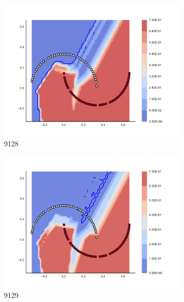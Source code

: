 \begin{figure}[h]
\begin{subfigure}[b]{0.09\textwidth}
    \includegraphics[clip, trim=2.35cm 1.75cm 4.5cm 0cm,width=\textwidth]{img/convergence/9128.pdf}
    \caption{9128}
    \label{fig:convergence_9128}
\end{subfigure}
%
\begin{subfigure}[b]{0.09\textwidth}
    \includegraphics[clip, trim=2.35cm 1.75cm 4.5cm 0cm,width=\textwidth]{img/convergence/9129.pdf}
    \caption{9129}
    \label{fig:convergence_9129}
\end{subfigure}
%
\begin{subfigure}[b]{0.09\textwidth}

\end{subfigure}
\end{figure}
